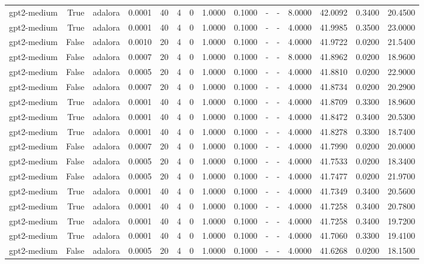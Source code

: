 \begin{tabular}{lrlrrrrrrlllrrr}
gpt2-medium & True & adalora & 0.0001 & 40 & 4 & 0 & 1.0000 & 0.1000 & - & - & 8.0000 & 42.0092 & 0.3400 & 20.4500 \\
gpt2-medium & True & adalora & 0.0001 & 40 & 4 & 0 & 1.0000 & 0.1000 & - & - & 4.0000 & 41.9985 & 0.3500 & 23.0000 \\
gpt2-medium & False & adalora & 0.0010 & 20 & 4 & 0 & 1.0000 & 0.1000 & - & - & 4.0000 & 41.9722 & 0.0200 & 21.5400 \\
gpt2-medium & False & adalora & 0.0007 & 20 & 4 & 0 & 1.0000 & 0.1000 & - & - & 8.0000 & 41.8962 & 0.0200 & 18.9600 \\
gpt2-medium & False & adalora & 0.0005 & 20 & 4 & 0 & 1.0000 & 0.1000 & - & - & 4.0000 & 41.8810 & 0.0200 & 22.9000 \\
gpt2-medium & False & adalora & 0.0007 & 20 & 4 & 0 & 1.0000 & 0.1000 & - & - & 4.0000 & 41.8734 & 0.0200 & 20.2900 \\
gpt2-medium & True & adalora & 0.0001 & 40 & 4 & 0 & 1.0000 & 0.1000 & - & - & 4.0000 & 41.8709 & 0.3300 & 18.9600 \\
gpt2-medium & True & adalora & 0.0001 & 40 & 4 & 0 & 1.0000 & 0.1000 & - & - & 4.0000 & 41.8472 & 0.3400 & 20.5300 \\
gpt2-medium & True & adalora & 0.0001 & 40 & 4 & 0 & 1.0000 & 0.1000 & - & - & 4.0000 & 41.8278 & 0.3300 & 18.7400 \\
gpt2-medium & False & adalora & 0.0007 & 20 & 4 & 0 & 1.0000 & 0.1000 & - & - & 4.0000 & 41.7990 & 0.0200 & 20.0000 \\
gpt2-medium & False & adalora & 0.0005 & 20 & 4 & 0 & 1.0000 & 0.1000 & - & - & 4.0000 & 41.7533 & 0.0200 & 18.3400 \\
gpt2-medium & False & adalora & 0.0005 & 20 & 4 & 0 & 1.0000 & 0.1000 & - & - & 4.0000 & 41.7477 & 0.0200 & 21.9700 \\
gpt2-medium & True & adalora & 0.0001 & 40 & 4 & 0 & 1.0000 & 0.1000 & - & - & 4.0000 & 41.7349 & 0.3400 & 20.5600 \\
gpt2-medium & True & adalora & 0.0001 & 40 & 4 & 0 & 1.0000 & 0.1000 & - & - & 4.0000 & 41.7258 & 0.3400 & 20.7800 \\
gpt2-medium & True & adalora & 0.0001 & 40 & 4 & 0 & 1.0000 & 0.1000 & - & - & 4.0000 & 41.7258 & 0.3400 & 19.7200 \\
gpt2-medium & True & adalora & 0.0001 & 40 & 4 & 0 & 1.0000 & 0.1000 & - & - & 4.0000 & 41.7060 & 0.3300 & 19.4100 \\
gpt2-medium & False & adalora & 0.0005 & 20 & 4 & 0 & 1.0000 & 0.1000 & - & - & 4.0000 & 41.6268 & 0.0200 & 18.1500 \\

\end{tabular}
